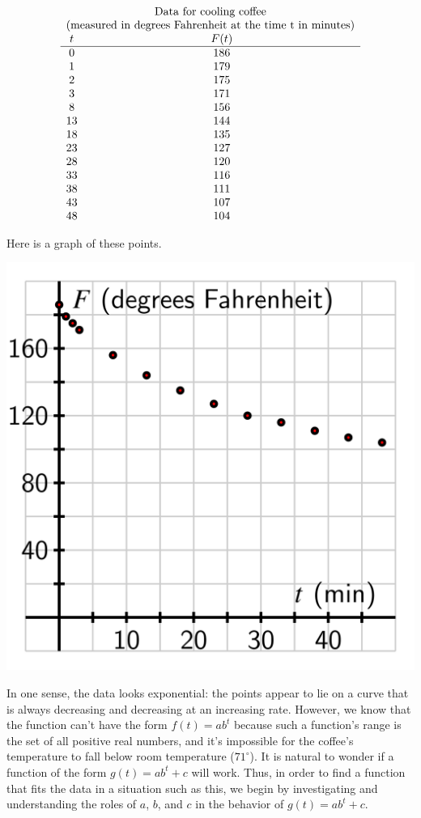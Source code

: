 \documentclass[nooutcomes]{ximera}
\begin{document}
$$
\begin{array}{cc}
\multicolumn{2}{c}{\text{Data for cooling coffee}}\\
\multicolumn{2}{c}{\text{(measured in degrees Fahrenheit at the time t in minutes)}}\\
t&F(t)\\
\hline
0&186\\
1&179\\
2&175\\
3&171\\
8&156\\
13&144\\
18&135\\
23&127\\
28&120\\
33&116\\
38&111\\
43&107\\
48&104
\end{array}
$$

Here is a graph of these points.

\begin{image}
\includegraphics{modeling-exp-coffee.jpg}
\end{image}


In one sense, the data looks exponential: the points appear to lie on a curve that is always decreasing and decreasing at an increasing rate.  However, we know that the function can't have the form $f(t) = ab^t$ because such a function's range is the set of all positive real numbers, and it's impossible for the coffee's temperature to fall below room temperature ($71^\circ$).  It is natural to wonder if a function of the form $g(t) = ab^t + c$ will work.  Thus, in order to find a function that fits the data in a situation such as this, we begin by investigating and understanding the roles of $a$, $b$, and $c$ in the behavior of $g(t) = ab^t + c$.
\end{document}
